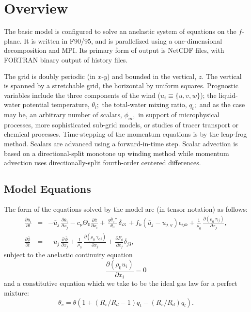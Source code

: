 \documentclass[11pt,a4paper]{article}
\begin{document}
\normalsize \baselineskip7mm

\newpage

\tableofcontents

\newpage
\section{Overview}

The basic model is configured to solve an anelastic system of
equations on the $f$-plane.  It is written in F90/95, and is
parallelized using a one-dimensional decomposition and MPI.  Its
primary form of output is NetCDF files, with FORTRAN binary output of
history files.

The grid is doubly periodic (in $x$-$y$) and bounded in the vertical,
$z.$ The vertical is spanned by a stretchable grid, the horizontal by
uniform squares.  Prognostic variables include the three components of
the wind ($u_i \equiv \{u,v,w\}$); the liquid-water potential
temperature, $\theta_l;$ the total-water mixing ratio, $q_t;$ and as
the case may be, an arbitrary number of scalars, $\phi_m,$ in support
of microphysical processes, more sophisticated sub-grid models, or
studies of tracer transport or chemical processes.  Time-stepping of
the momentum equations is by the leap-frog method.  Scalars are
advanced using a forward-in-time step.  Scalar advection is based on a
directional-split monotone up winding method while momentum advection
uses directionally-split fourth-order centered differences.

\subsection{Model Equations}
The form of the equations solved by the model are (in tensor notation)
as follows:
\begin{eqnarray}
\frac{\partial \bar{u}_i}{\partial t} & = &- \bar{u}_j \,
\frac{\partial \bar{u}_i}{\partial x_j} - c_p \Theta_0 \frac{\partial
\bar{\pi}}{\partial x_i} + \, \frac{g \bar{\theta}_v ''}{\theta_0} \,
\delta_{i3} \, + f_k (\bar{u}_j - u_{j,g}) \epsilon_{ijk} +
\frac{1}{\rho_0} \, \frac{\partial (\rho_0 \, \tau_{ij})} {\partial
x_j} ,
\label{eq:FM} \\
\frac{\partial \bar{\phi}}{\partial t} & = & - \bar{u}_j \,
\frac{\partial \, \bar{\phi}}{\partial x_j} + \frac{1}{\rho_0} \,
\frac{\partial (\rho_0 \, \gamma_{\phi j})} {\partial x_j} +
\frac{\partial F_{\phi}}{\partial x_j} \delta_{j3} ,
\label{eq:FTD}
\end{eqnarray}
subject to the anelastic continuity equation
\begin{equation}
\frac{\partial (\rho_0 u_i) }{\partial x_i} = 0 \label{eq:continuity}
\end{equation}
and a constitutive equation which we take to be the ideal gas law for
a perfect mixture:
\begin{equation}
\theta_v = \theta\left(1 + (R_v/R_d-1)q_t - (R_v/R_d)q_l\right).
\end{equation}
\end{document}
